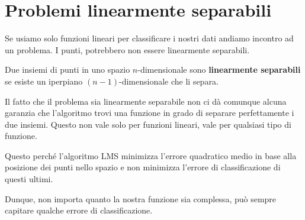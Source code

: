 \section{Problemi linearmente separabili}
Se usiamo solo funzioni lineari per classificare i nostri dati andiamo incontro ad un problema. I punti, potrebbero non
essere linearmente separabili.
\begin{definition}
	Due insiemi di punti in uno spazio $n$-dimensionale sono \textbf{linearmente separabili} se esiste un
	iperpiano $(n-1)$-dimensionale che li separa.
\end{definition}

Il fatto che il problema sia linearmente separabile non ci d\`a comunque alcuna garanzia che l'algoritmo trovi una
funzione in grado di separare perfettamente i due insiemi. Questo non vale solo per funzioni lineari, vale per qualsiasi
tipo di funzione.

Questo perch\'e l'algoritmo LMS minimizza l'errore quadratico medio in base alla posizione dei punti nello spazio e non
minimizza l'errore di classificazione di questi ultimi.

Dunque, non importa quanto la nostra funzione sia complessa, pu\`o sempre capitare qualche errore di classificazione.